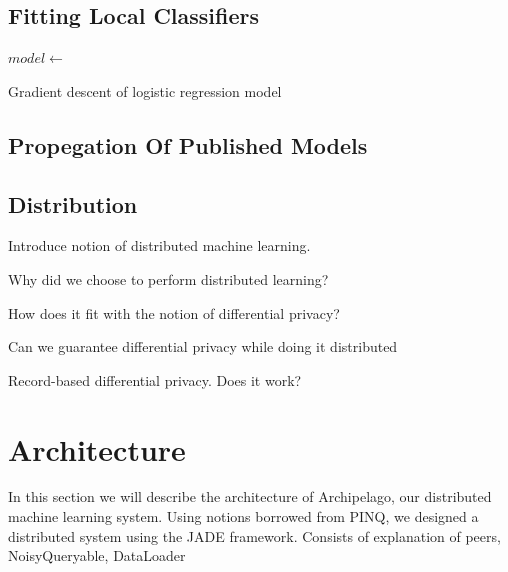 
\subsection{Fitting Local Classifiers}

\begin{algorithm}[H]
	$model \leftarrow 	$
	\caption{Gradient descent of logistic regression model}
\end{algorithm}

\subsection{Propegation Of Published Models}


\subsection{Distribution}
Introduce notion of distributed machine learning. 

Why did we choose to perform distributed learning?

How does it fit with the notion of differential privacy?

Can we guarantee differential privacy while doing it distributed

Record-based differential privacy. Does it work?




\section{Architecture}

In this section we will describe the architecture of Archipelago, our distributed machine learning system. 
Using notions borrowed from PINQ, we designed a distributed system using the JADE framework. Consists of explanation of peers, NoisyQueryable, DataLoader


